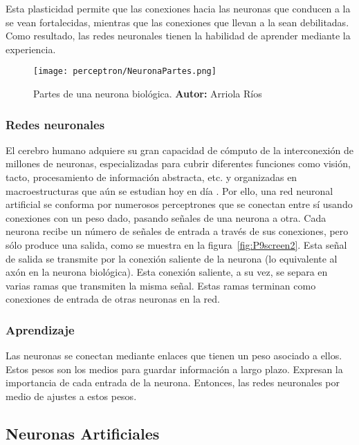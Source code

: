 Esta plasticidad permite que las conexiones hacia las neuronas que conducen a la  se vean fortalecidas, mientras que las conexiones que llevan a la  sean debilitadas. Como resultado, las redes neuronales tienen la habilidad de aprender mediante la experiencia.

\begin{figure}
  \centering
  \texttt{[image: perceptron/NeuronaPartes.png]}
  \caption{Partes de una neurona biológica. \textbf{Autor:} Arriola Ríos}
  \label{fig:P9screen1}
\end{figure}

\subsubsection{Redes neuronales}

El cerebro humano adquiere su gran capacidad de cómputo de la interconexión de millones de neuronas, especializadas para cubrir diferentes funciones como visión, tacto, procesamiento de información abstracta, etc. y organizadas en macroestructuras que aún se estudian hoy en día \parencite{Mesulam1998}.  Por ello, una red neuronal artificial se conforma por numerosos perceptrones que se conectan entre sí usando conexiones con un peso dado, pasando señales de una neurona a otra. Cada neurona recibe un número de señales de entrada a través de sus conexiones, pero sólo produce una salida, como se muestra en la figura~\ref{fig:P9screen2}. Esta señal de salida se transmite por la conexión saliente de la neurona (lo equivalente al axón en la neurona biológica). Esta conexión saliente, a su vez, se separa en varias ramas que transmiten la misma señal. Estas ramas terminan como conexiones de entrada de otras neuronas en la red.

\subsubsection{Aprendizaje}

\noindent Las neuronas se conectan mediante enlaces que tienen un peso asociado a ellos. Estos pesos son los medios para guardar información a largo plazo. Expresan la importancia de cada entrada de la neurona. Entonces, las redes neuronales  por medio de ajustes a estos pesos.


\subsection{Neuronas Artificiales}

